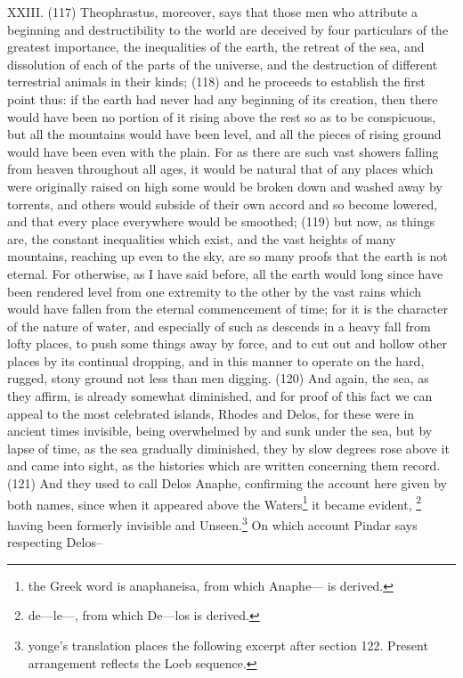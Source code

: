 XXIII. (117) Theophrastus, moreover, says that those men who attribute a beginning and
destructibility to the world are deceived by four particulars of the greatest importance, the
inequalities of the earth, the retreat of the sea, and dissolution of each of the parts of the universe,
and the destruction of different terrestrial animals in their kinds; (118) and he proceeds to establish
the first point thus: if the earth had never had any beginning of its creation, then there would have
been no portion of it rising above the rest so as to be conspicuous, but all the mountains would
have been level, and all the pieces of rising ground would have been even with the plain. For as
there are such vast showers falling from heaven throughout all ages, it would be natural that of any
places which were originally raised on high some would be broken down and washed away by
torrents, and others would subside of their own accord and so become lowered, and that every
place everywhere would be smoothed; (119) but now, as things are, the constant inequalities which
exist, and the vast heights of many mountains, reaching up even to the sky, are so many proofs
that the earth is not eternal. For otherwise, as I have said before, all the earth would long since
have been rendered level from one extremity to the other by the vast rains which would have fallen
from the eternal commencement of time; for it is the character of the nature of water, and
especially of such as descends in a heavy fall from lofty places, to push some things away by
force, and to cut out and hollow other places by its continual dropping, and in this manner to
operate on the hard, rugged, stony ground not less than men digging. (120) And again, the sea, as
they affirm, is already somewhat diminished, and for proof of this fact we can appeal to the most
celebrated islands, Rhodes and Delos, for these were in ancient times invisible, being
overwhelmed by and sunk under the sea, but by lapse of time, as the sea gradually diminished,
they by slow degrees rose above it and came into sight, as the histories which are written
concerning them record. (121) And they used to call Delos Anaphe, confirming the account here
given by both names, since when it appeared above the Waters\footnote{the Greek word is anaphaneisa, from
which Anaphe— is derived.} it became evident, \footnote{de—le—, from which De—los is derived.} having been formerly
invisible and Unseen.\footnote{yonge's translation places the following excerpt after section 122. Present arrangement
reflects the Loeb sequence.} On which account Pindar says respecting Delos--

